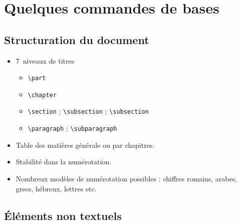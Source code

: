 \section{Quelques commandes de bases}

\subsection{Structuration du document}

\begin{slide}
  \begin{itemize}
    \item 7~niveaux de titres
      \begin{itemize}
	\item \verb.\part.
	\item \verb.\chapter.
	\item \verb.\section. ; \verb.\subsection. ; \verb.\subsection.
	\item \verb.\paragraph. ; \verb.\subparagraph.
      \end{itemize}
    \item Table des matières générale ou par chapitres.
    \item Stabilité dans la numérotation.
    \item Nombreux modèles de numérotation possibles : chiffres romains, arabes, grecs, hébreux, lettres etc.
  \end{itemize}
\end{slide}

\subsection{Éléments non textuels}

